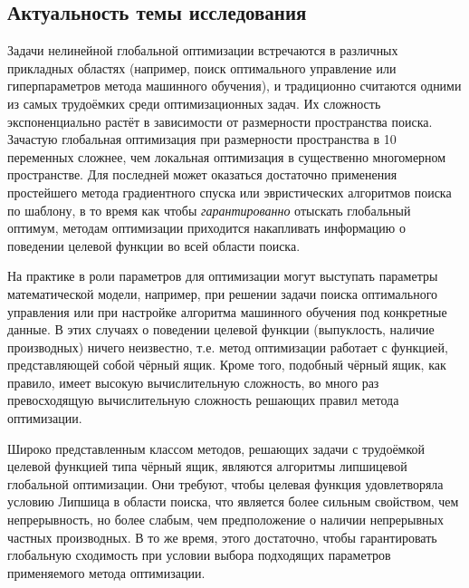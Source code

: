 
\subsection*{Актуальность темы исследования}

Задачи нелинейной глобальной оптимизации встречаются в различных прикладных областях (например, поиск оптимального
управление или гиперпараметров метода машинного обучения),
и традиционно считаются одними из самых трудоёмких среди оптимизационных задач.
Их сложность экспоненциально растёт в зависимости от размерности пространства поиска.
Зачастую глобальная оптимизация при размерности пространства в 10 переменных сложнее,
чем локальная оптимизация в существенно многомерном пространстве.
Для последней может оказаться достаточно применения простейшего метода градиентного спуска
или эвристических алгоритмов поиска по шаблону,
в то время как чтобы \textit{гарантированно} отыскать глобальный оптимум, методам
оптимизации приходится накапливать информацию о поведении целевой функции во всей области поиска.

На практике в роли параметров для оптимизации могут выступать параметры математической модели, например, при решении
задачи поиска оптимального управления или при настройке алгоритма машинного обучения под конкретные данные.
В этих случаях о поведении целевой функции (выпуклость, наличие производных) ничего неизвестно, т.е. метод оптимизации
работает с функцией, представляющей собой чёрный ящик. Кроме того, подобный чёрный ящик, как правило,
имеет высокую вычислительную сложность, во много раз превосходящую вычислительную сложность решающих правил метода оптимизации.

Широко представленным классом методов, решающих задачи с трудоёмкой целевой функцией типа чёрный ящик, являются
алгоритмы липшицевой глобальной оптимизации. Они требуют, чтобы целевая функция удовлетворяла условию Липшица в области поиска,
что является более сильным свойством, чем непрерывность, но более слабым, чем предположение о наличии непрерывных частных производных.
В то же время, этого достаточно, чтобы гарантировать глобальную сходимость при условии выбора
подходящих параметров применяемого метода оптимизации.

